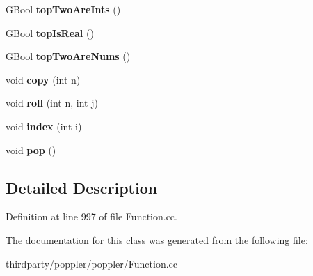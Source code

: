 \begin{DoxyCompactItemize}
G\+Bool {\bfseries top\+Two\+Are\+Ints} ()
\item 
\mbox{\label{class_p_s_stack_a99b39594437f257f7d750ab6e65e44a6}} 
G\+Bool {\bfseries top\+Is\+Real} ()
\item 
\mbox{\label{class_p_s_stack_a7df86d77dd248e8fb7d45d80ee36dab6}} 
G\+Bool {\bfseries top\+Two\+Are\+Nums} ()
\item 
\mbox{\label{class_p_s_stack_ab73dbc84d9e73b4144a558a57ceacbb4}} 
void {\bfseries copy} (int n)
\item 
\mbox{\label{class_p_s_stack_aebdd46f2a921892fe21133dcf338f3c9}} 
void {\bfseries roll} (int n, int j)
\item 
\mbox{\label{class_p_s_stack_ad494df059983c92ab45d7aab74e3654c}} 
void {\bfseries index} (int i)
\item 
\mbox{\label{class_p_s_stack_a80542e3bbf43ec8fc1a9bf85fc71ed73}} 
void {\bfseries pop} ()
\end{DoxyCompactItemize}


\subsection{Detailed Description}


Definition at line 997 of file Function.\+cc.



The documentation for this class was generated from the following file\+:\begin{DoxyCompactItemize}
\item 
thirdparty/poppler/poppler/Function.\+cc\end{DoxyCompactItemize}
